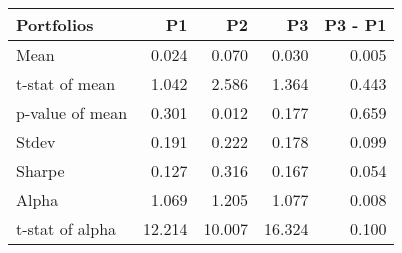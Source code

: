 \begin{tabular}{lrrrr}
\toprule
Portfolios & P1 & P2 & P3 & P3 - P1 \\
\midrule
Mean & 0.024 & 0.070 & 0.030 & 0.005 \\
t-stat of mean & 1.042 & 2.586 & 1.364 & 0.443 \\
p-value of mean & 0.301 & 0.012 & 0.177 & 0.659 \\
Stdev & 0.191 & 0.222 & 0.178 & 0.099 \\
Sharpe & 0.127 & 0.316 & 0.167 & 0.054 \\
Alpha & 1.069 & 1.205 & 1.077 & 0.008 \\
t-stat of alpha & 12.214 & 10.007 & 16.324 & 0.100 \\
\bottomrule
\end{tabular}
